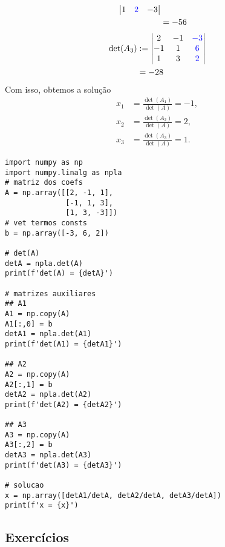 \begin{ex}
\begin{subequations}
\begin{align}
\begin{vmatrix}
                  1 & {\color{blue}2} & -3
                \end{vmatrix}\\
              &= -56
    \end{align}
  \end{subequations}
  \begin{subequations}
    \begin{align}
      \det(A_3) &:=
                \begin{vmatrix}
                  2 & -1 & {\color{blue}-3}\\
                  -1 & 1 & {\color{blue}6}\\
                  1 & 3 & {\color{blue}2}
                \end{vmatrix}\\
              &= -28
    \end{align}
  \end{subequations}
  Com isso, obtemos a solução
  \begin{subequations}
    \begin{align}
      x_1 &= \frac{\det(A_1)}{\det(A)} = -1,\\
      x_2 &= \frac{\det(A_2)}{\det(A)} = 2,\\
      x_3 &= \frac{\det(A_3)}{\det(A)} = 1.
    \end{align}
  \end{subequations}

\begin{lstlisting}
import numpy as np
import numpy.linalg as npla
# matriz dos coefs
A = np.array([[2, -1, 1],
              [-1, 1, 3],
              [1, 3, -3]])
# vet termos consts
b = np.array([-3, 6, 2])

# det(A)
detA = npla.det(A)
print(f'det(A) = {detA}')

# matrizes auxiliares
## A1
A1 = np.copy(A)
A1[:,0] = b
detA1 = npla.det(A1)
print(f'det(A1) = {detA1}')

## A2
A2 = np.copy(A)
A2[:,1] = b
detA2 = npla.det(A2)
print(f'det(A2) = {detA2}')

## A3
A3 = np.copy(A)
A3[:,2] = b
detA3 = npla.det(A3)
print(f'det(A3) = {detA3}')

# solucao
x = np.array([detA1/detA, detA2/detA, detA3/detA])
print(f'x = {x}')
\end{lstlisting}

\end{ex}


\subsection{Exercícios}

